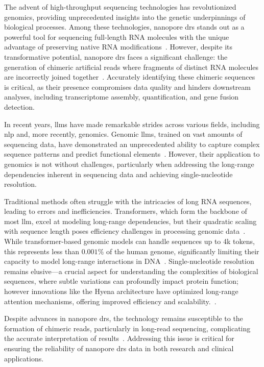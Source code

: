 \documentclass[pdflatex, sn-mathphys-num, lineno]{sn-jnl}%
\theoremstyle{thmstyleone}%
\theoremstyle{thmstyletwo}%
\theoremstyle{thmstylethree}%
\begin{document}
The advent of high-throughput sequencing technologies has revolutionized genomics, providing unprecedented insights into the genetic underpinnings of biological processes.
Among these technologies, nanopore \gls{drs} stands out as a powerful tool for sequencing full-length RNA molecules with the unique advantage of preserving native RNA modifications~\cite{ozsolak2009direct, garalde2018highly, jain2022advances}.
However, despite its transformative potential, nanopore \gls{drs} faces a significant challenge: the generation of chimeric artificial reads where fragments of distinct RNA molecules are incorrectly joined together~\cite{smith2020molecular}.
Accurately identifying these chimeric sequences is critical, as their presence compromises data quality and hinders downstream analyses, including transcriptome assembly, quantification, and gene fusion detection.

In recent years, \glspl{llm} have made remarkable strides across various fields, including \gls{nlp} and, more recently, genomics.
Genomic \glspl{llm}, trained on vast amounts of sequencing data, have demonstrated an unprecedented ability to capture complex sequence patterns and predict functional elements~\cite{dalla2023nucleotide, zhou2023dnabert2}.
However, their application to genomics is not without challenges, particularly when addressing the long-range dependencies inherent in sequencing data and achieving single-nucleotide resolution.

Traditional methods  often struggle with the intricacies of long RNA sequences, leading to errors and inefficiencies.
Transformers, which form the backbone of most \gls{llm}, excel at modeling long-range dependencies, but their quadratic scaling with sequence length poses efficiency challenges in processing genomic data~\cite{tay2022efficient}.
While transformer-based genomic models can handle sequences up to 4k tokens, this represents less than $0.001\%$ of the human genome, significantly limiting their capacity to model long-range interactions in DNA~\cite{dalla2023nucleotide, zhou2023dnabert2, ji2021dnabert, nguyen2024hyenadna}.
Single-nucleotide resolution remains elusive—a crucial aspect for understanding the complexities of biological sequences, where subtle variations can profoundly impact protein function; however innovations like the Hyena architecture have optimized long-range attention mechanisms, offering improved efficiency and scalability.~\cite{poli2023hyena, nguyen2024hyenadna}.

Despite advances in nanopore \gls{drs}, the technology remains susceptible to the formation of chimeric reads, particularly in long-read sequencing, complicating the accurate interpretation of results~\cite{smith2020molecular}.
Addressing this issue is critical for ensuring the reliability of nanopore \gls{drs} data in both research and clinical applications.
\end{document}
